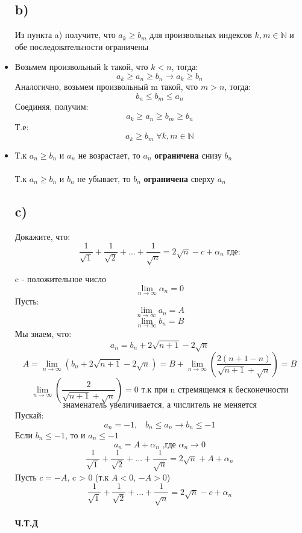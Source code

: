 \documentclass[a4paper,12pt]{article}
\begin{document}
\begin{itemize}
\subsection*{b)}
Из пункта a) получите, что $a_k \geq b_m$ для произвольных индексов $k, m \in \mathbb{N}$ и обе последовательности ограничены
\item
Возьмем произвольный k такой, что $k < n$, тогда:
\[
a_k \geq a_n \geq b_n \rightarrow a_k \geq b_n
\]
Аналогично, возьмем произвольный m такой, что $ m > n$, тогда:
\[
b_n \leq b_m \leq a_n
\]
Соединяя, получим:
\[
a_k \geq a_n \geq b_m \geq b_n 
\]
Т.е:
\[
a_k \geq b_m \; \forall k, m \in \mathbb{N}
\]
\item
Т.к $a_n \geq b_n$ и $a_n$ не возрастает, то $a_n$ \textbf{ограничена} снизу $ b_n $
\\\\
Т.к  $a_n \geq b_n$ и $b_n$ не убывает, то  $b_n$  \textbf{ограничена} сверху $a_n$
\subsection*{c)}
Докажите, что:
\[
\frac{1}{\sqrt{1}} + \frac{1}{\sqrt{2}} + \ldots + \frac{1}{\sqrt{n}} = 2 \sqrt{n} - c + \alpha_n \text{ где:}
\]
\begin{center}
c -  положительное число
\[
\lim_{n \rightarrow \infty} \alpha_n = 0
\]
Пусть:
\[
\lim_{n \rightarrow \infty } a_n = A
\]
\[
\lim_{n \rightarrow \infty} b_n = B
\]
Мы знаем, что:
\[
a_n = b_n + 2\sqrt{n+1} - 2\sqrt{n}
\]
\[
A = \lim\limits_{n \rightarrow \infty} (b_n + 2\sqrt{n+1} - 2\sqrt{n}) = B + \lim_{n \rightarrow \infty} \left( \frac{2(n+1-n)}{\sqrt{n+1} + \sqrt{n}} \right) = B
\]
\[
 \lim_{n \rightarrow \infty}  \left(\frac{2}{\sqrt{n+1} + \sqrt{n}}\right) = 0 \text{  т.к при n стремящемся к бесконечности} 
\]
\[
\text{знаменатель увеличивается, а числитель не меняется}
\]
Пускай:
\[
a_n = -1,\; \;\; b_n \leq a_n \rightarrow b_n \leq -1
\]
Если $b_n \leq -1$, то и $a_n \leq -1$
\[
a_n = A + \alpha_n \text{ ,где } \alpha_n \rightarrow 0
\]
\[
\frac{1}{\sqrt{1}} + \frac{1}{\sqrt{2}} + \ldots + \frac{1}{\sqrt{n}} = 2\sqrt{n} + A + \alpha_n
\]
Пусть $c = -A$, c > 0 (т.к $ A < 0$, $ -A >0$)
\[
\frac{1}{\sqrt{1}} + \frac{1}{\sqrt{2}} + \ldots + \frac{1}{\sqrt{n}} = 2\sqrt{n} - c + \alpha_n
\]
\\
\textbf{Ч.Т.Д}
\end{center}
\end{itemize}
\end{document}
